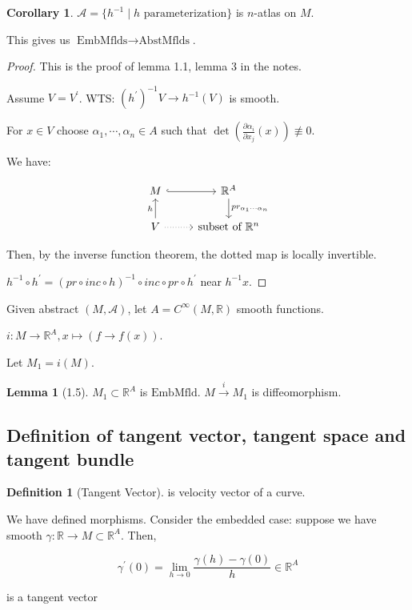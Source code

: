 \documentclass{article}
\theoremstyle{definition}
\newtheorem*{definition}{Definition}
\newtheorem{lemma}[theorem]{Lemma}
\newtheorem{corollary}[theorem]{Corollary}
\begin{document}
    \begin{corollary}
        \(\mathcal{A} = \{ h ^{-1} \mid h \text{ parameterization} \}\) is \(n\)-atlas on \(M\).

        This gives us \(\text{EmbMflds}\to \text{AbstMflds}\).
    \end{corollary}

    \begin{proof}
        This is the proof of lemma 1.1, lemma 3 in the notes.

        Assume \(V = V^{\prime}\). WTS: \((h^{\prime})^{-1} V \to h ^{-1} (V)\) is smooth.

        For \(x\in V\) choose \(\alpha_1, \cdots , \alpha_n \in A\) such that \(\det \left( \frac{\partial \alpha_i}{\partial x_j} (x) \right)  \not\equiv 0\). 

        We have:

        \[
            \begin{tikzcd}
                M \ar[r, hook] & \mathbb{R}^A \ar[d, "pr_{\alpha_1 \cdots \alpha_n}"] \\ V \ar[u,"h"] \ar[r,dotted] & \text{subset of } \mathbb{R}^n
            \end{tikzcd}
        \]

        Then, by the inverse function theorem, the dotted map is locally invertible.

        \(h^{-1} \circ h^{\prime} = (pr \circ inc \circ h)^{-1} \circ inc \circ pr \circ h^{\prime}\) near \(h ^{-1} x\).

    \end{proof}

    Given abstract \((M,\mathcal{A})\), let \(A = C^{\infty} (M,\mathbb{R})\) smooth functions.
    
    \(i: M \to \mathbb{R}^A, x \mapsto (f \to f(x))\).
    
    Let \(M_1 = i(M)\).
    
    \begin{lemma}
        [1.5] \(M_1 \subset \mathbb{R}^A\) is \(\text{EmbMfld}\). \(M \xrightarrow{i} M_1\) is diffeomorphism.
    \end{lemma}

    \subsection*{Definition of tangent vector, tangent space and tangent bundle}

    \begin{definition}
        [Tangent Vector] is velocity vector of a curve.

        We have defined morphisms. Consider the embedded case: suppose we have smooth \(\gamma : \mathbb{R} \to M \subset \mathbb{R}^A\). Then,

        \[
            \gamma^{\prime} (0) = \lim_{h \to 0} \frac{\gamma (h) - \gamma(0)}{h} \in \mathbb{R}^A
        \]

        is a tangent vector
    \end{definition}
\end{document}
